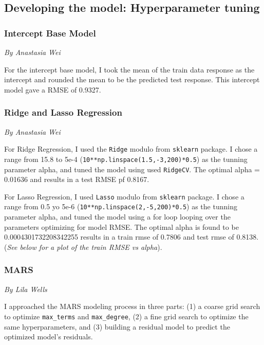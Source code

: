 \documentclass[
  letterpaper,
  DIV=11,
  numbers=noendperiod]{scrartcl}
\begin{document}
\hypertarget{developing-the-model-hyperparameter-tuning}{%
\subsection{Developing the model: Hyperparameter
tuning}\label{developing-the-model-hyperparameter-tuning}}

\hypertarget{intercept-base-model}{%
\subsubsection{Intercept Base Model}\label{intercept-base-model}}

\emph{By Anastasia Wei}

For the intercept base model, I took the mean of the train data response
as the intercept and rounded the mean to be the predicted test response.
This intercept model gave a RMSE of 0.9327.

\hypertarget{ridge-and-lasso-regression}{%
\subsubsection{Ridge and Lasso
Regression}\label{ridge-and-lasso-regression}}

\emph{By Anastasia Wei}

For Ridge Regression, I used the \texttt{Ridge} modulo from
\texttt{sklearn} package. I chose a range from 15.8 to 5e-4
(\texttt{10**np.linspace(1.5,-3,200)*0.5}) as the tunning parameter
alpha, and tuned the model using used \texttt{RidgeCV}. The optimal
alpha = 0.01636 and results in a test RMSE pf 0.8167.

For Lasso Regression, I used \texttt{Lasso} modulo from \texttt{sklearn}
package. I chose a range from 0.5 yo 5e-6
(\texttt{10**np.linspace(2,-5,200)*0.5}) as the tunning parameter alpha,
and tuned the model using a for loop looping over the parameters
optimizing for model RMSE. The optimal alpha is found to be
0.0004301732208342255 results in a train rmse of 0.7806 and test rmse of
0.8138. (\emph{See below for a plot of the train RMSE vs alpha}).

\hypertarget{mars}{%
\subsubsection{MARS}\label{mars}}

\emph{By Lila Wells}

I approached the MARS modeling process in three parts: (1) a coarse grid
search to optimize \texttt{max\_terms} and \texttt{max\_degree}, (2) a
fine grid search to optimize the same hyperparameters, and (3) building
a residual model to predict the optimized model's residuals.
\end{document}
